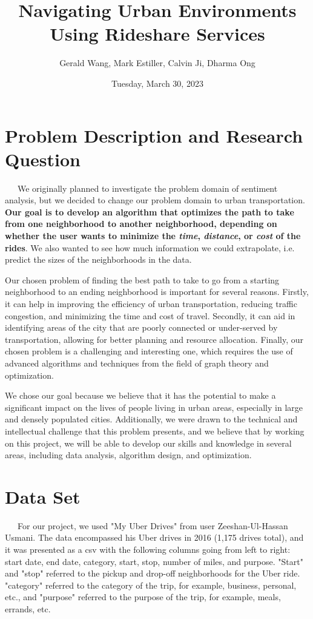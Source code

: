 \documentclass[fontsize=11pt]{article}
\title{Navigating Urban Environments Using Rideshare Services}
\author{Gerald Wang, Mark Estiller, Calvin Ji, Dharma Ong}
\date{Tuesday, March 30, 2023}
\begin{document}
\maketitle

\section*{Problem Description and Research Question}

\ \ \ We originally planned to investigate the problem domain of sentiment analysis, but we decided to change our problem domain to urban transportation. \textbf{Our goal is to develop an algorithm that optimizes the path to take from one neighborhood to another neighborhood, depending on whether the user wants to minimize the \emph{time}, \emph{distance}, or \emph{cost} of the rides}. We also wanted to see how much information we could extrapolate, i.e. predict the sizes of the neighborhoods in the data. \newline

Our chosen problem of finding the best path to take to go from a starting neighborhood to an ending neighborhood is important for several reasons. Firstly, it can help in improving the efficiency of urban transportation, reducing traffic congestion, and minimizing the time and cost of travel. Secondly, it can aid in identifying areas of the city that are poorly connected or under-served by transportation, allowing for better planning and resource allocation. Finally, our chosen problem is a challenging and interesting one, which requires the use of advanced algorithms and techniques from the field of graph theory and optimization.\newline

We chose our goal because we believe that it has the potential to make a significant impact on the lives of people living in urban areas, especially in large and densely populated cities. Additionally, we were drawn to the technical and intellectual challenge that this problem presents, and we believe that by working on this project, we will be able to develop our skills and knowledge in several areas, including data analysis, algorithm design, and optimization.

\section*{Data Set}

\ \ \ For our project, we used "My Uber Drives" from user Zeeshan-Ul-Hassan Usmani. The data encompassed his Uber drives in 2016 (1,175 drives total), and it was presented as a csv with the following columns going from left to right: start date, end date, category, start, stop, number of miles, and purpose. "Start" and "stop" referred to the pickup and drop-off neighborhoods for the Uber ride. "category" referred to the category of the trip, for example, business, personal, etc., and "purpose" referred to the purpose of the trip, for example, meals, errands, etc.
\end{document}
